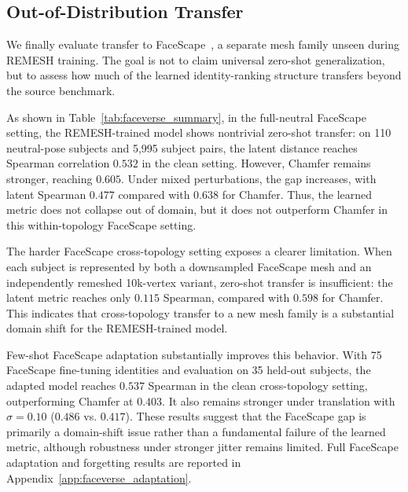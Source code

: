 \documentclass[10pt,twocolumn,letterpaper]{article}
\begin{document}
\subsection{Out-of-Distribution Transfer}
\label{sec:ood_transfer}
We finally evaluate transfer to FaceScape~\cite{facescape}, a separate mesh family unseen during REMESH training. The goal is not to claim universal zero-shot generalization, but to assess how much of the learned identity-ranking structure transfers beyond the source benchmark.

As shown in Table~\ref{tab:faceverse_summary}, in the full-neutral FaceScape setting, the REMESH-trained model shows nontrivial zero-shot transfer: on 110 neutral-pose subjects and 5,995 subject pairs, the latent distance reaches Spearman correlation $0.532$ in the clean setting. However, Chamfer remains stronger, reaching $0.605$. Under mixed perturbations, the gap increases, with latent Spearman $0.477$ compared with $0.638$ for Chamfer. Thus, the learned metric does not collapse out of domain, but it does not outperform Chamfer in this within-topology FaceScape setting.

The harder FaceScape cross-topology setting exposes a clearer limitation. When each subject is represented by both a downsampled FaceScape mesh and an independently remeshed 10k-vertex variant, zero-shot transfer is insufficient: the latent metric reaches only $0.115$ Spearman, compared with $0.598$ for Chamfer. This indicates that cross-topology transfer to a new mesh family is a substantial domain shift for the REMESH-trained model.

Few-shot FaceScape adaptation substantially improves this behavior. With 75 FaceScape fine-tuning identities and evaluation on 35 held-out subjects, the adapted model reaches $0.537$ Spearman in the clean cross-topology setting, outperforming Chamfer at $0.403$. It also remains stronger under translation with $\sigma=0.10$ ($0.486$ vs. $0.417$). These results suggest that the FaceScape gap is primarily a domain-shift issue rather than a fundamental failure of the learned metric, although robustness under stronger jitter remains limited. Full FaceScape adaptation and forgetting results are reported in
Appendix~\ref{app:faceverse_adaptation}.
\end{document}
